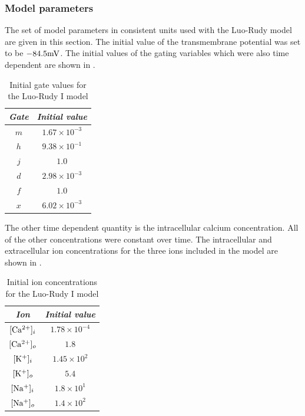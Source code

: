 \subsubsection{Model parameters}
The set of model parameters in consistent units used with the Luo-Rudy model
are given in this section. The initial value of the transmembrane potential
was set to be $-84.5\mathrm{mV}$. The initial values of the gating variables which
were also time dependent are shown in .
\begin{table}[hbtp] \centering
  \begin{tabular}{|c|c|}
    \hline
    \emph{Gate} & \emph{Initial value} \\ 
    \hline
    \hline 
      $m$ & $1.67 \times 10^{-3}$ \\
      $h$ & $9.38 \times 10^{-1}$ \\
      $j$ & $1.0$ \\
      $d$ & $2.98 \times 10^{-3}$ \\
      $f$ & $1.0$ \\
      $x$ & $6.02 \times 10^{-3}$ \\
    \hline
  \end{tabular}
  \caption[Initial gate values for the Luo-Rudy I model]{Initial gate
    values for the Luo-Rudy I model}
  \label{tab:lr1_init_gates}
\end{table}
The other time dependent quantity is the intracellular calcium
concentration. All of the other concentrations were constant over time. 
The intracellular and extracellular ion concentrations for the three
ions included in the model are shown in .
\begin{table}[hbtp] \centering
  \begin{tabular}{|c|c|}
    \hline
    \emph{Ion} & \emph{Initial value} \\ 
    \hline
    \hline 
      $ [\mathrm{Ca^{2+}}]_{i} $ & $1.78 \times 10^{-4}$ \\
      $ [\mathrm{Ca^{2+}}]_{o} $ & $1.8$ \\
      $ [\mathrm{K^{+}}]_{i} $ & $1.45 \times 10^{2}$ \\
      $ [\mathrm{K^{+}}]_{o} $ & $5.4$ \\
      $ [\mathrm{Na^{+}}]_{i} $ & $1.8 \times 10^{1}$ \\
      $ [\mathrm{Na^{+}}]_{o} $ & $1.4 \times 10^{2}$ \\
    \hline
  \end{tabular}
  \caption[Initial ion concentrations for the Luo-Rudy I model]{Initial ion
    concentrations for the Luo-Rudy I model}
  \label{tab:lr1_init_ions}
\end{table}

